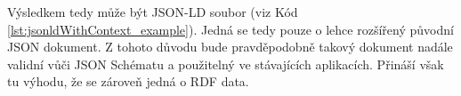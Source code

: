 Výsledkem tedy může být JSON-LD soubor (viz Kód \ref{lst:jsonldWithContext_example}). Jedná se tedy pouze o lehce rozšířený původní JSON dokument. Z tohoto důvodu bude pravděpodobně takový dokument nadále validní vůči JSON Schématu a použitelný ve stávajících aplikacích. Přináší však tu výhodu, že se zároveň jedná o RDF data.

\newpage





